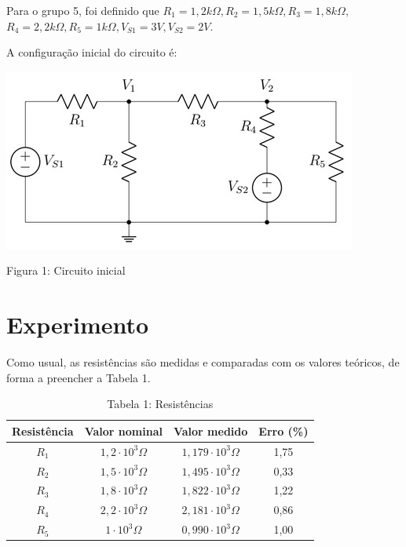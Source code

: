 \documentclass[a4 paper]{article}
\newcommand{\parag}{\hspace{30pt}}
\begin{document}
 Para o grupo 5, foi definido que $R_1=1,2k\Omega, R_2=1,5k\Omega, R_3=1,8k\Omega,$ $R_4=2,2k\Omega, R_5=1k\Omega, V_{S1}=3V, V_{S2}=2V$.

A configuração inicial do circuito é:

\begin{table}[h]
\centering
\includegraphics[scale=0.6]{figuras/figura1}
\end{table}

\begin{center}
Figura 1: Circuito inicial
\end{center}


\newpage\section{Experimento}

\parag Como usual, as resistências são medidas e comparadas com os valores teóricos, de forma a preencher a Tabela 1.

\vspace{5pt}
\begin{table}[h]
\centering
\begin{tabular}{|c|c|c|c|}
\hline
 Resistência & Valor nominal & Valor medido & Erro (\%) \\\hline
 $R_1$&$1,2\cdot10^3\Omega$ &$1,179\cdot10^3\Omega$ &1,75 \\\hline
 $R_2$&$1,5\cdot10^3\Omega$ &$1,495\cdot10^3\Omega$ &0,33 \\\hline
 $R_3$&$1,8\cdot10^3\Omega$ &$1,822\cdot10^3\Omega$ &1,22 \\\hline
 $R_4$&$2,2\cdot10^3\Omega$ &$2,181\cdot10^3\Omega$ &0,86 \\\hline
 $R_5$&$1\cdot10^3\Omega$ &$0,990\cdot10^3\Omega$ &1,00 \\\hline
\end{tabular}
\caption*{Tabela 1: Resistências}
\end{table}
\end{document}
